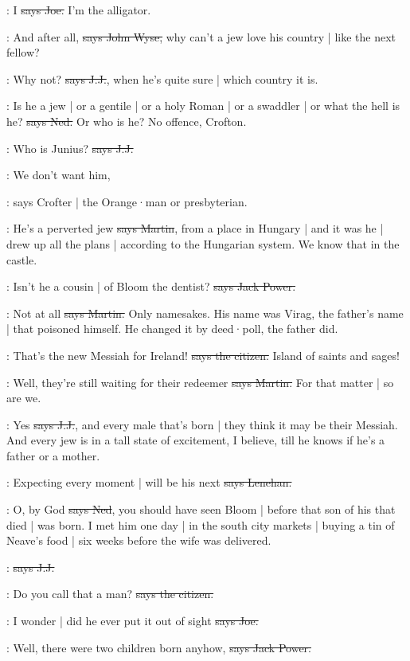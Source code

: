 \joe:
I
\sout{says Joe.}
I'm the alligator.

\johnwyse:
And after all,
\sout{says John Wyse,}
why can't a jew love his country |
like the next fellow?

\jjom:
Why not?
\sout{says J.J.},
when he's quite sure |
which country it is.

\lambert:
Is he a jew |
or a gentile |
or a holy Roman |
or a swaddler |
or what the hell is he?
\sout{says Ned.}
Or who is he?
No offence,
Crofton.

\jjom:
Who is Junius?
\sout{says J.J.}

\crofton:
We don't want him,

\Nq:
says Crofter |
the Orange·man or presbyterian.

\cunningham:
He's a perverted jew
\sout{says Martin},
from a place in Hungary |
and it was he |
drew up all the plans |
according to the Hungarian system.
We know that in the castle.

\power:
Isn't he a cousin |
of Bloom the dentist?
\sout{says Jack Power.}

\cunningham:
Not at all
\sout{says Martin.}
Only namesakes.
His name was Virag,
the father's name |
that poisoned himself.
He changed it by deed·poll,
the father did.

\citizen:
That's the new Messiah for Ireland!
\sout{says the citizen.}
Island of saints and sages!

\cunningham:
Well,
they're still waiting for their redeemer
\sout{says Martin.}
For that matter |
so are we.

\jjom:
Yes
\sout{says J.J.},
and every male that's born |
they think it may be their Messiah.
And every jew is in a tall state of excitement,
I believe,
till he knows if he's a father or a mother.

\lenehan:
Expecting every moment |
will be his next
\sout{says Lenehan.}

\lambert:
O,
by God
\sout{says Ned},
you should have seen Bloom |
before that son of his that died |
was born.
I met him one day |
in the south city markets |
buying a tin of Neave's food |
six weeks before the wife was delivered.

\jjom:
\sout{says J.J.}

\citizen:
Do you call that a man?
\sout{says the citizen.}

\joe:
I wonder |
did he ever put it out of sight
\sout{says Joe.}

\power:
Well,
there were two children born anyhow,
\sout{says Jack Power.}

